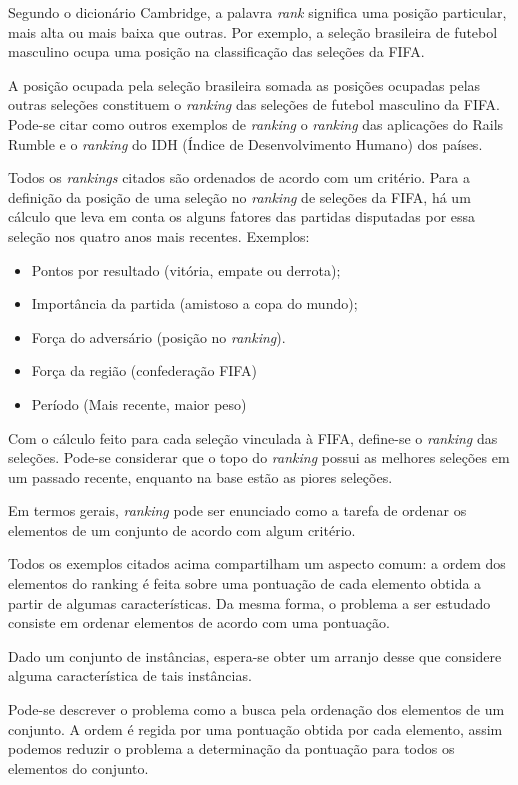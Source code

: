Segundo o dicionário Cambridge, a palavra \emph{rank} significa uma posição
particular, mais alta ou mais baixa que outras. Por exemplo, a seleção
brasileira de futebol masculino ocupa uma posição na classificação das
seleções da FIFA.

A posição ocupada pela seleção brasileira somada as posições ocupadas pelas
outras seleções constituem o \emph{ranking} das seleções de futebol
masculino da FIFA. Pode-se citar como outros exemplos de \emph{ranking} o
\emph{ranking} das aplicações do Rails Rumble e o \emph{ranking} do IDH
(Índice de Desenvolvimento Humano) dos países.

Todos os \emph{rankings} citados são ordenados de acordo com um critério.
Para a definição da posição de uma seleção no \emph{ranking} de seleções
da FIFA, há um cálculo que leva em conta os alguns fatores das partidas
disputadas por essa seleção nos quatro anos mais recentes. Exemplos:

\begin{itemize}
    \item Pontos por resultado (vitória, empate ou derrota);
    \item Importância da partida (amistoso a copa do mundo);
    \item Força do adversário (posição no \emph{ranking}).
    \item Força da região (confederação FIFA)
    \item Período (Mais recente, maior peso)
\end{itemize}

Com o cálculo feito para cada seleção vinculada à FIFA, define-se o
\emph{ranking} das seleções. Pode-se considerar que o topo do \emph{ranking}
possui as melhores seleções em um passado recente, enquanto na base estão
as piores seleções.

Em termos gerais, \emph{ranking} pode ser enunciado como a tarefa de
ordenar os elementos de um conjunto de acordo com algum critério.

Todos os exemplos citados acima compartilham um aspecto comum: a ordem dos
elementos do ranking é feita sobre uma pontuação de cada elemento obtida a
partir de algumas características. Da mesma forma, o problema a ser estudado
consiste em ordenar elementos de acordo com uma pontuação.

Dado um conjunto de instâncias, espera-se obter um arranjo desse que considere
alguma característica de tais instâncias.

Pode-se descrever o problema como a busca pela ordenação dos elementos de um
conjunto. A ordem é regida por uma pontuação obtida por cada elemento, assim
podemos reduzir o problema a determinação da pontuação para todos os
elementos do conjunto.